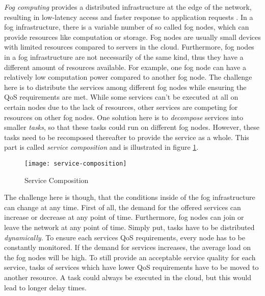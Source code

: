 \textit{Fog computing} provides a distributed infrastructure at the edge of the network, resulting in low-latency access and faster response to application requests \cite{mobility-aware-scheduling}. In a fog infrastructure, there is a variable number of so called fog nodes, which can provide resources like computation or storage. Fog nodes are usually small devices with limited resources compared to servers in the cloud. Furthermore, fog nodes in a fog infrastructure are not necessarily of the same kind, thus they have a different amount of resources available. For example, one fog node can have a relatively low computation power compared to another fog node. The challenge here is to distribute the services among different fog nodes while ensuring the QoS requirements are met. While some services can’t be executed at all on certain nodes due to the lack of resources, other services are competing for resources on other fog nodes. One solution here is to \textit{decompose} services into smaller \textit{tasks}, so that these tasks could run on different fog nodes. However, these tasks need to be recomposed thereafter to provide the service as a whole. This part is called \textit{service composition} and is illustrated in figure \ref{fig:service-composition}.\\

\begin{figure}
    \centering
    \texttt{[image: service-composition]}
    \caption{Service Composition}
    \label{fig:service-composition}
\end{figure}

The challenge here is though, that the conditions inside of the fog infrastructure can change at any time. First of all, the demand for the offered services can increase or decrease at any point of time. Furthermore, fog nodes can join or leave the network at any point of time. Simply put, tasks have to be distributed \textit{dynamically}. To ensure each services QoS requirements, every node has to be constantly monitored. If the demand for services increases, the average load on the fog nodes will be high. To still provide an acceptable service quality for each service, tasks of services which have lower QoS requirements have to be moved to another resource. A task could always be executed in the cloud, but this would lead to longer delay times.